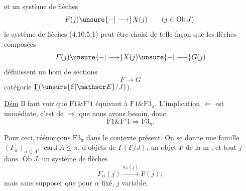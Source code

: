  et un système de flèches
\[
 F(j)\unsure{\mathbin{-}|\longrightarrow} X(j)\qquad (j\in\operatorname{Ob}J).
\]
  le système de flèches (4.10.5.1) peut être choisi de telle façon que les flèches composées
\[
 F(j)\unsure{\mathbin{-}|\longrightarrow} X(j)\unsure{\mathbin{-}|\longrightarrow}G(j)
\]
définissent un hom de sections
\[
 F\longrightarrow G
\]
 catégorie $\underline{\Gamma}(\unsure{\mathcal E|\mathscr E}/J)$).


\uline{Dém} Il faut voir que $\mathrm F1\mathbin{\&}\mathrm F'1$ équivaut à $\mathrm F1\mathbin{\&}\mathrm F3_{\pi}$. L'implication $\Longleftarrow$ est \inserted{$\pm$} immédiate, c'est de $\Longrightarrow$ que nous avons besoin, donc
\[
 \mathrm F1\mathbin{\&}\mathrm F'1\Longrightarrow\mathrm F3_{\pi}.
\]

Pour ceci,  réénonçons $\mathrm F3_{\pi}$ dans le contexte présent. On se donne une famille $(F_{\alpha})_{\alpha\in A}$, $\operatorname{card}A\leq\pi$, d'objets de $\underline{\Gamma}(\mathcal E/J)$, un objet $F$ de la $\overline{\mathrm m}$ , et  tout $j$ dans $\operatorname{Ob}J$, un système de flèches
\[
 F_{\alpha}(j)\xrightarrow{u_{\alpha}(j)} F(j),
\]
mais sans supposer que pour $\alpha$ fixé, $j$ variable,
